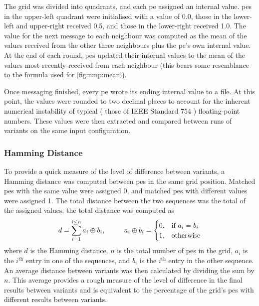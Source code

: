 The grid was divided into quadrants, and each \gls{pe} assigned an internal value.  \Glspl{pe} in the upper-left quadrant were initialised with a value of \num{0.0}, those in the lower-left and upper-right received \num{0.5}, and those in the lower-right received \num{1.0}.  The value for the next message to each neighbour was computed as the mean of the values received from the other three neighbours plus the \gls{pe}'s own internal value.  At the end of each round, \glspl{pe} updated their internal values to the mean of the values most-recently-received from each neighbour (this bears some resemblance to the formula used for \cref{fig:nmp:mean}).

Once messaging finished, every \gls{pe} wrote its ending internal value to a file.  At this point, the values were rounded to two decimal places to account for the inherent numerical instability of typical (\eg{} those of IEEE Standard 754 \cite{ieee754,Goldberg1991}) floating-point numbers.  These values were then extracted and compared between runs of variants on the same input configuration.

\subsubsection{Hamming Distance}
To provide a quick measure of the level of difference between variants, a Hamming distance was computed between \glspl{pe} in the same grid position.  Matched \glspl{pe} with the same value were assigned \num{0}, and matched \glspl{pe} with different values were assigned 1.  The total distance between the two sequences was the total of the assigned values.  \Ie{} the total distance was computed as \[d = \sum_{i = 1}^{i \leq n} a_i \oplus b_i\text{,}
\hspace{1.0cm}%
a_i \oplus b_i = \begin{cases}
    0, & \text{if } a_i = b_i \\
    1, & \text{otherwise}
\end{cases}
\] where \(d\) is the Hamming distance, \(n\) is the total number of \glspl{pe} in the grid, \(a_i\) is the \(i^{\text{th}}\) entry in one of the sequences, and \(b_i\) is the \(i^{\text{th}}\) entry in the other sequence.  An average distance between variants was then calculated by dividing the sum by \(n\).  This average provides a rough measure of the level of difference in the final results between variants and is equivalent to the percentage of the grid's \glspl{pe} with different results between variants.

